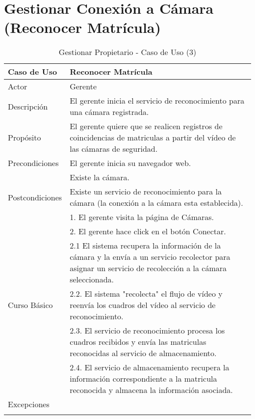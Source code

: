 \section{Gestionar Conexión a Cámara (Reconocer Matrícula)}

    \begin{longtable}{@{} p{3cm} p{10cm} @{}} \toprule
    \textbf{Caso de Uso}    & Reconocer Matrícula \\ \midrule
    Actor                   & Gerente \\ \cmidrule{1-2}
    Descripción             & El gerente inicia el servicio de reconocimiento para una cámara registrada. \\ \cmidrule{1-2}
    Propósito               & El gerente quiere que se realicen registros de coincidencias de matriculas a partir del vídeo de las cámaras de seguridad. \\ \cmidrule{1-2}
    Precondiciones          & El gerente inicia su navegador web. \\ 
                            & Existe la cámara. \\ \cmidrule{1-2} 
    Postcondiciones         & Existe un servicio de reconocimiento para la cámara (la conexión a la cámara esta establecida). \\ \cmidrule{1-2} 
                            & 1. El gerente visita la página de Cámaras. \\ 
                            & 2. El gerente hace click en el botón Conectar. \\
                            & 2.1 El sistema recupera la información de la cámara y la envía a un servicio recolector para asignar un servicio de recolección a la cámara seleccionada. \\
    Curso Básico            & 2.2. El sistema "recolecta" el flujo de vídeo y reenvía los cuadros del vídeo al servicio de reconocimiento. \\
                            & 2.3. El servicio de reconocimiento procesa los cuadros recibidos y envía  las matriculas reconocidas al servicio de almacenamiento. \\
                            & 2.4. El servicio de almacenamiento recupera la información correspondiente a la matricula reconocida y almacena la información asociada. \\ \cmidrule{1-2}
    Excepciones             & \\ \bottomrule
   \caption{Gestionar Propietario - Caso de Uso (3)} \label{tab:tabcu-matri}  \\
   \end{longtable}
       
